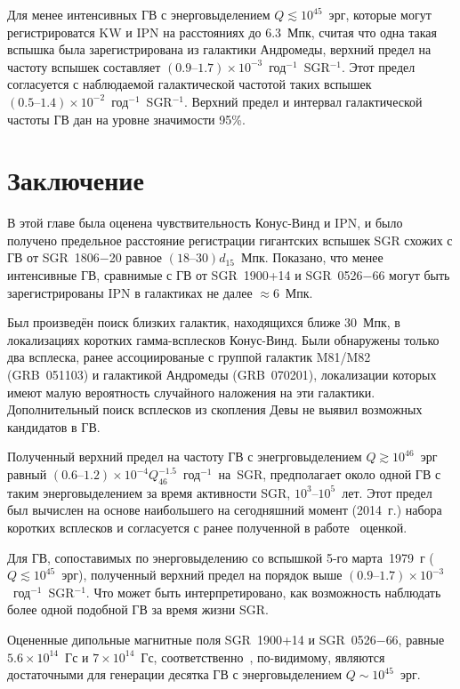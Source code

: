 Для менее интенсивных ГВ с энерговыделением $Q \lesssim 10^{45}$~эрг, которые 
могут регистрироватся KW и IPN на расстояниях до 6.3~Мпк, считая что 
одна такая вспышка была зарегистрирована из галактики Андромеды, верхний предел 
на частоту вспышек составляет
${(0.9\textrm{--}1.7)\times 10^{-3}}$~год$^{-1}$~SGR$^{-1}$. Этот предел согласуется
с наблюдаемой галактической частотой таких вспышек 
${(0.5\textrm{--}1.4)\times 10^{-2}}$~год$^{-1}$~SGR$^{-1}$. Верхний предел и 
интервал галактической частоты ГВ дан на уровне значимости 95\%.

\section{Заключение}\label{Summary}
В этой главе была оценена чувствительность Конус-Винд и IPN, и было получено 
предельное расстояние регистрации гигантских вспышек SGR схожих с ГВ от SGR~1806$-$20 
равное $(18\textrm{--}30) d_{15}$~Мпк. Показано, что менее интенсивные ГВ, сравнимые 
с ГВ от SGR~1900+14 и SGR~0526$-$66 могут быть зарегистрированы IPN в галактиках 
не далее $\approx 6$~Мпк.

Был произведён поиск близких галактик, находящихся ближе 30~Мпк, в локализациях 
коротких гамма-всплесков Конус-Винд. Были обнаружены только два всплеска, ранее 
ассоциированые с группой галактик M81/M82 (GRB~051103) и галактикой Андромеды (GRB~070201),
локализации которых имеют малую вероятность случайного наложения на эти галактики.
Дополнительный поиск всплесков из скопления Девы не выявил возможных кандидатов в ГВ.

Полученный верхний предел на частоту ГВ с энегрговыделением $Q \gtrsim 10^{46}$~эрг равный
${(0.6\textrm{--}1.2)\times 10^{-4} Q_{46}^{-1.5}}$~год$^{-1}$~на~SGR, предполагает 
около одной ГВ с таким энерговыделением за время активности SGR, $10^3\textrm{--}10^5$~лет. 
Этот предел был вычислен на основе наибольшего на сегодняшний момент (2014~г.) 
набора коротких всплесков и согласуется с ранее полученной в работе~\citep{Ofek_2007ApJ} оценкой.
 
Для ГВ, сопоставимых по энерговыделению со вспышкой 5-го марта~1979~г ($Q \lesssim 10^{45}$~эрг), 
полученный верхний предел на порядок выше $(0.9\textrm{--}1.7)\times 10^{-3}$~год$^{-1}$~SGR$^{-1}$. 
Что может быть интерпретировано, как возможность наблюдать более одной подобной ГВ за время жизни SGR.

Оцененные дипольные  магнитные поля SGR~1900+14 и SGR~0526$-$66, равные
$5.6\times10^{14}$~Гс и $7\times10^{14}$~Гс, соответственно~\citep{Olausen_Kaspi2014}, 
по-видимому, являются достаточными для генерации десятка ГВ с энерговыделением $Q \sim 10^{45}$~эрг.

